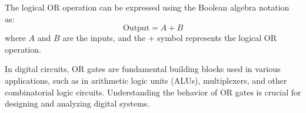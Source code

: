 The logical OR operation can be expressed using the Boolean algebra notation as:
\[
\text{Output} = A + B
\]
where \( A \) and \( B \) are the inputs, and the + symbol represents the logical OR operation.

In digital circuits, OR gates are fundamental building blocks used in various applications, such as in arithmetic logic units (ALUs), multiplexers, and other combinatorial logic circuits. Understanding the behavior of OR gates is crucial for designing and analyzing digital systems.

